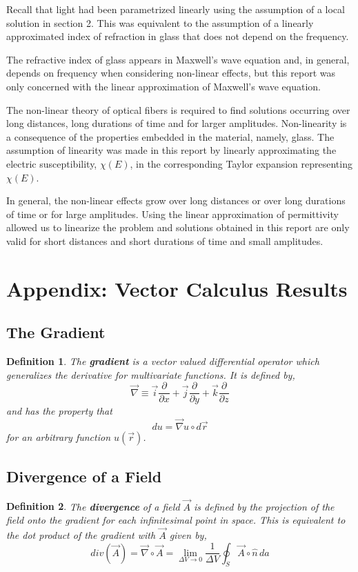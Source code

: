\documentclass[12pt]{article}
\newtheorem{definition}{Definition}[section]
\theoremstyle{definition}
\numberwithin{equation}{section}
\begin{document}
{Recall that light had been parametrized linearly using the assumption of a local solution in section 2. This was equivalent to the assumption of a linearly approximated index of refraction in glass that does not depend on the frequency.

The refractive index of glass appears in Maxwell's wave equation and, in general, depends on frequency when considering non-linear effects, but this report was only concerned with the linear approximation of Maxwell's wave equation.

The non-linear theory of optical fibers is required to find solutions occurring over long distances, long durations of time and for larger amplitudes. Non-linearity is a consequence of the properties embedded in the material, namely, glass. The assumption of linearity was made in this report by linearly approximating the electric susceptibility, $\chi(E)$, in the corresponding Taylor expansion representing $\chi(E)$. 

In general, the non-linear effects grow over long distances or over long durations of time or for large amplitudes. Using the linear approximation of permittivity allowed us to linearize the problem and solutions obtained in this report are only valid for short distances and short durations of time and small amplitudes.
\appendix
\section{Appendix: Vector Calculus Results}\label{A.sec}
\subsection{The Gradient}
\begin{definition} The \textbf{gradient} is a vector valued differential operator which generalizes the derivative for multivariate functions. It is defined by,
\begin{equation}
\vec{\nabla}\equiv\vec{i}\frac{\partial}{\partial x}+\vec{j}\frac{\partial}{\partial y}+\vec{k}\frac{\partial}{\partial z}
\label{grad.eqn}
\end{equation}
and has the property that
\begin{equation}
du=\vec{\nabla}u\circ d\vec{r}
\label{gradient2.eqn}
\end{equation} 
for an arbitrary function $u(\vec{r})$.
\end{definition}
\subsection{Divergence of a Field}
\begin{definition}The \textbf{divergence} of a field $\vec{A}$ is defined by the projection of the field onto the gradient for each infinitesimal point in space. This is equivalent to the dot product of the gradient with $\vec{A}$ given by,
\begin{equation}
div(\vec{A})=\vec{\nabla}\circ\vec{A}=\lim_{\Delta V\to 0}\frac{1}{\Delta V}\oint_{S}\vec{A}\circ\hat{n}\,da
\label{diver.eqn}
\end{equation}
\end{definition}
}
\end{document}
